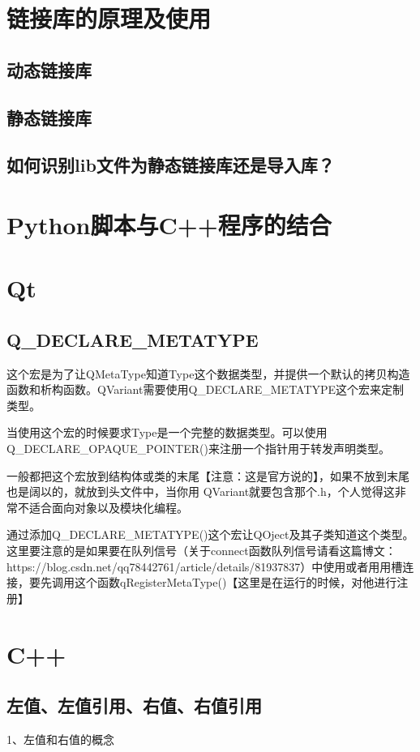 \section{链接库的原理及使用}
\subsection{动态链接库}
\subsection{静态链接库}
\subsection{如何识别lib文件为静态链接库还是导入库？}
\section{Python脚本与C++程序的结合}

\section{Qt}
\subsection{Q\_DECLARE\_METATYPE}
这个宏是为了让QMetaType知道Type这个数据类型，并提供一个默认的拷贝构造函数和析构函数。QVariant需要使用Q\_DECLARE\_METATYPE这个宏来定制类型。

当使用这个宏的时候要求Type是一个完整的数据类型。可以使用Q\_DECLARE\_OPAQUE\_POINTER()来注册一个指针用于转发声明类型。

一般都把这个宏放到结构体或类的末尾【注意：这是官方说的】，如果不放到末尾也是阔以的，就放到头文件中，当你用 QVariant就要包含那个.h，个人觉得这非常不适合面向对象以及模块化编程。

通过添加Q\_DECLARE\_METATYPE()这个宏让QOject及其子类知道这个类型。这里要注意的是如果要在队列信号（关于connect函数队列信号请看这篇博文：https://blog.csdn.net/qq78442761/article/details/81937837）中使用或者用用槽连接，要先调用这个函数qRegisterMetaType()【这里是在运行的时候，对他进行注册】

\section{C++}
\subsection{左值、左值引用、右值、右值引用}
1、左值和右值的概念

